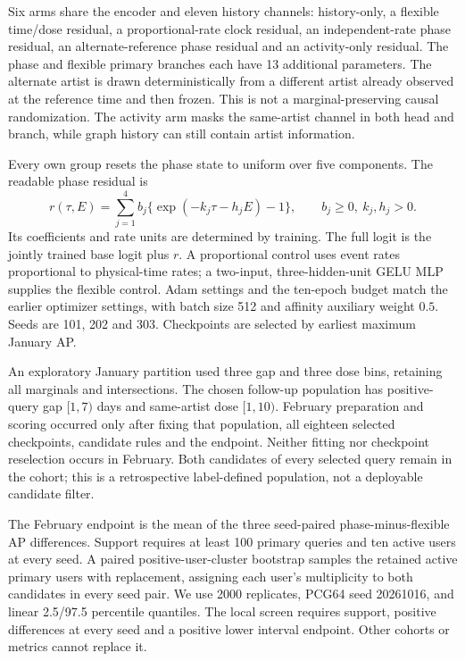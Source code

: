 Six arms share the encoder and eleven history channels: history-only, a flexible time/dose residual, a proportional-rate clock residual, an independent-rate phase residual, an alternate-reference phase residual and an activity-only residual. The phase and flexible primary branches each have 13 additional parameters. The alternate artist is drawn deterministically from a different artist already observed at the reference time and then frozen. This is not a marginal-preserving causal randomization. The activity arm masks the same-artist channel in both head and branch, while graph history can still contain artist information.

Every own group resets the phase state to uniform over five components. The readable phase residual is
\begin{equation}\label{eq:residual}
r(\tau,E)=\sum_{j=1}^4 b_j
\{\exp(-k_j\tau-h_jE)-1\},\qquad b_j\ge0,\ k_j,h_j>0.
\end{equation}
Its coefficients and rate units are determined by training. The full logit is the jointly trained base logit plus $r$. A proportional control uses event rates proportional to physical-time rates; a two-input, three-hidden-unit GELU MLP supplies the flexible control. Adam settings and the ten-epoch budget match the earlier optimizer settings, with batch size 512 and affinity auxiliary weight $0.5$. Seeds are 101, 202 and 303. Checkpoints are selected by earliest maximum January AP.

An exploratory January partition used three gap and three dose bins, retaining all marginals and intersections. The chosen follow-up population has positive-query gap $[1,7)$ days and same-artist dose $[1,10)$. February preparation and scoring occurred only after fixing that population, all eighteen selected checkpoints, candidate rules and the endpoint. Neither fitting nor checkpoint reselection occurs in February. Both candidates of every selected query remain in the cohort; this is a retrospective label-defined population, not a deployable candidate filter.

The February endpoint is the mean of the three seed-paired phase-minus-flexible AP differences. Support requires at least 100 primary queries and ten active users at every seed. A paired positive-user-cluster bootstrap samples the retained active primary users with replacement, assigning each user's multiplicity to both candidates in every seed pair. We use 2000 replicates, PCG64 seed 20261016, and linear 2.5/97.5 percentile quantiles. The local screen requires support, positive differences at every seed and a positive lower interval endpoint. Other cohorts or metrics cannot replace it.

